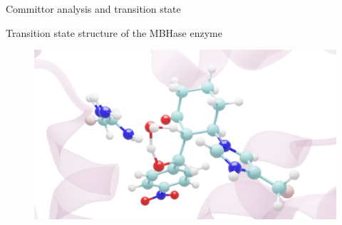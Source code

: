 \documentclass[final]{beamer}
\newlength{\colwidth}
\begin{document}
\begin{frame}[t]
\begin{columns}[t]
\begin{column}{\colwidth}
  \begin{block}{Committor analysis and transition state}
  \begin{figure}
        \qquad
    \end{figure}

  \end{block}

  \begin{block}{Transition state structure of the MBHase enzyme}
\begin{figure}
\includegraphics[width=0.6\colwidth]{figures/trans-120.png}
\end{figure}
  \end{block}


\end{column}
\end{columns}
\end{frame}
\end{document}
